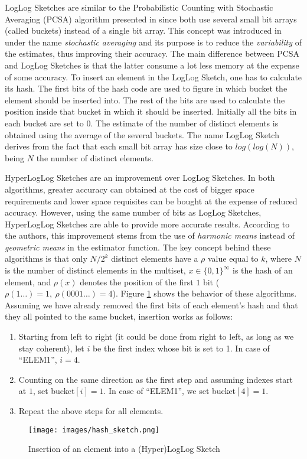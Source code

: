 LogLog Sketches \cite{Durand:2003tc} are similar to the Probabilistic
Counting with Stochastic Averaging (PCSA) algorithm presented in
\cite{Flajolet:1985wd} since both use several small bit arrays (called
buckets) instead of a single bit array. This concept was introduced in
\cite{Flajolet:1985wd} under the name \emph{stochastic averaging} and
its purpose is to reduce the \emph{variability} of the estimates, thus
improving their accuracy. The main difference between PCSA and LogLog
Sketches is that the latter consume a lot less memory at the expense
of some accuracy. To insert an element in the LogLog Sketch, one has
to calculate its hash. The first bits of the hash code are used to
figure in which bucket the element should be inserted into. The rest
of the bits are used to calculate the position inside that bucket in
which it should be inserted. Initially all the bits in each bucket are
set to $0$. The estimate of the number of distinct elements is
obtained using the average of the several buckets. The name LogLog
Sketch derives from the fact that each small bit array has size close
to $log(log(N))$, being $N$ the number of distinct elements. 

HyperLogLog Sketches \cite{Fusy:2007um} are an improvement over LogLog
Sketches. In both algorithms, greater accuracy can obtained at the
cost of bigger space requirements and lower space requisites can be
bought at the expense of reduced accuracy. However, using the same
number of bits as LogLog Sketches, HyperLogLog Sketches are able to
provide more accurate results. According to the authors, this
improvement stems from the use of \emph{harmonic means} instead of
\emph{geometric means} in the estimator function. The key concept
behind these algorithms is that only $N/2^k$ distinct elements have a
$\rho$ value equal to $k$, where $N$ is the number of distinct
elements in the multiset, $x\in\{0,1\}^\infty$ is the hash of an
element, and $\rho(x)$ denotes the position of the first $1$ bit
($\rho(1\ldots)=1,\ \rho(0001\ldots)=4$). Figure
\ref{fig:hyperloglog_sketches} shows the behavior of these algorithms.
Assuming we have already removed the first bits of each element's hash
and that they all pointed to the same bucket, insertion works as
follows:
\begin{enumerate}
\item Starting from left to right (it could be done from right to
  left, as long as we stay coherent), let $i$ be the first
  index whose bit is set to 1. In case of ``ELEM1'', $i=4$.
\item Counting on the same direction as the first step and
  assuming indexes start at $1$, set bucket$[i]=1$. In case of
  ``ELEM1'', we set bucket$[4]=1$.
\item Repeat the above steps for all elements.
\end{enumerate}
\begin{figure}[htb]
  \centering
  \texttt{[image: images/hash\_sketch.png]}
  \caption{Insertion of an element into a (Hyper)LogLog Sketch}
  \label{fig:hyperloglog_sketches}
\end{figure}

